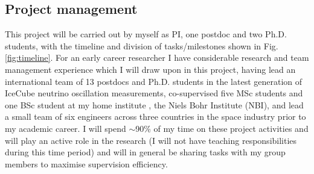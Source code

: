\documentclass[a4paper,11pt]{article}
\begin{document}
\subsection{Project management}

This project will be carried out by myself as PI, one postdoc and two Ph.D. students, with the timeline and division of tasks/milestones shown in Fig. \ref{fig:timeline}. For an early career researcher I have considerable research and team management experience which I will draw upon in this project, having lead an international team of 13 postdocs and Ph.D. students in the latest generation of IceCube neutrino oscillation measurements, co-supervised five MSc students and one BSc student at my home institute , the Niels Bohr Institute (NBI), and lead a small team of six engineers across three countries in the space industry prior to my academic career. I will spend $\sim$90\% of my time on these project activities and will play an active role in the research (I will not have teaching responsibilities during this time period) and will in general be sharing tasks with my group members to maximise supervision efficiency.
\end{document}
